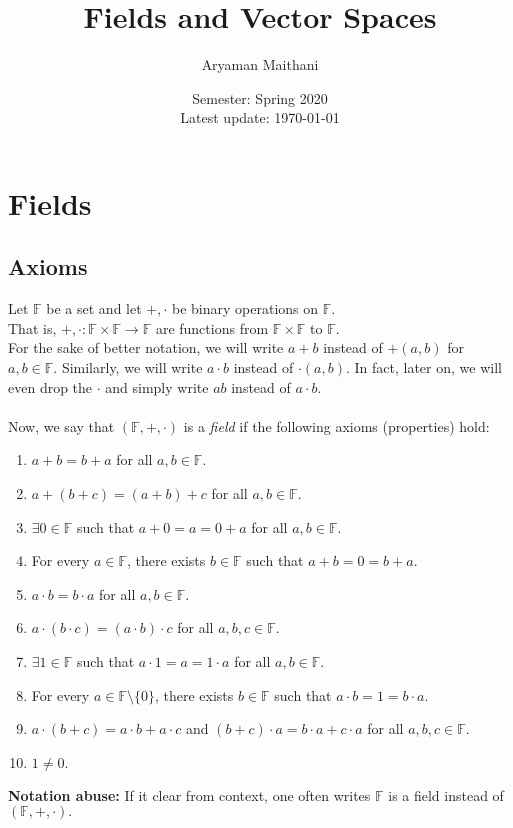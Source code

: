 \documentclass{article}
\title{Fields and Vector Spaces}
\author{Aryaman Maithani}%
\date{Semester: Spring 2020\\ Latest update: \today}
\begin{document}
\maketitle

\section{Fields}
\subsection{Axioms}

Let $\mathbb{F}$ be a set and let $+, \cdot$ be binary operations on $\mathbb{F}.$\\
That is, $+, \cdot:\mathbb{F}\times\mathbb{F}\to\mathbb{F}$ are functions from $\mathbb{F}\times\mathbb{F}$ to $\mathbb{F}$.\\
For the sake of better notation, we will write $a + b$ instead of $+(a, b)$ for $a, b \in \mathbb{F}.$ Similarly, we will write $a\cdot b$ instead of $\cdot(a, b).$ In fact, later on, we will even drop the $\cdot$ and simply write $ab$ instead of $a\cdot b.$\\~\\
Now, we say that $(\mathbb{F}, +, \cdot)$ is a \emph{field} if the following axioms (properties) hold:
\begin{enumerate}[label = (A\arabic*)] 
	\item $a + b = b + a$ for all $a, b \in \mathbb{F}.$
	\item $a + (b + c) = (a + b) + c$ for all $a, b \in \mathbb{F}.$
	\item $\exists 0 \in \mathbb{F}$ such that $a + 0 = a = 0 + a$ for all $a, b \in \mathbb{F}.$
	\item For every $a \in \mathbb{F}$, there exists $b \in \mathbb{F}$ such that $a + b = 0 = b + a.$
	\item $a \cdot b = b \cdot a$ for all $a, b \in \mathbb{F}.$
	\item $a \cdot (b \cdot c) = (a \cdot b) \cdot c$ for all $a, b, c \in \mathbb{F}.$
	\item $\exists 1 \in \mathbb{F}$ such that $a \cdot 1 = a = 1 \cdot a$ for all $a, b \in \mathbb{F}.$
	\item For every $a \in \mathbb{F}\setminus\{0\}$, there exists $b \in \mathbb{F}$ such that $a \cdot b = 1 = b \cdot a.$
	\item $a\cdot(b + c) = a\cdot b + a\cdot c$ and $(b + c)\cdot a = b\cdot a + c \cdot a$ for all $a, b, c \in \mathbb{F}.$
	\item $1 \neq 0.$

\end{enumerate}
\textbf{Notation abuse:} If it clear from context, one often writes $\mathbb{F}$ is a field instead of $(\mathbb{F}, +, \cdot).$
\end{document}
